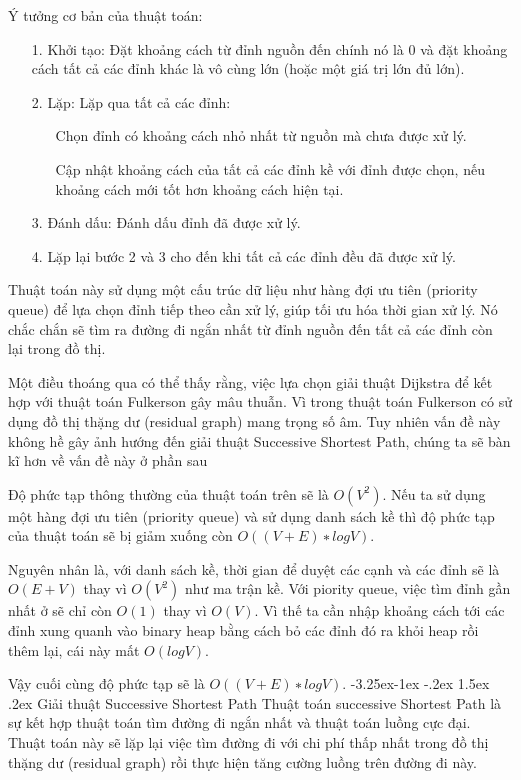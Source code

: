 \documentclass[a4paper]{article}
\makeatletter
\newcounter {subsubsubsection}[subsubsection]
\newcommand\subsubsubsection{\@startsection{subsubsubsection}{4}{\z@}%
                                     {-3.25ex\@plus -1ex \@minus -.2ex}%
                                     {1.5ex \@plus .2ex}%
                                     {\normalfont\normalsize\bfseries}}
\makeatother
\begin{document}
{Ý tưởng cơ bản của thuật toán:}
\begin{enumerate}
    \item[1.] {Khởi tạo: Đặt khoảng cách từ đỉnh nguồn đến chính nó là 0 và đặt khoảng cách tất cả các đỉnh khác là vô cùng lớn (hoặc một giá trị lớn đủ lớn).}
    \item[2.] {Lặp: Lặp qua tất cả các đỉnh:} 
    \begin{enumerate}
        \item[\bullet] {Chọn đỉnh có khoảng cách nhỏ nhất từ nguồn mà chưa được xử lý.}
        \item[\bullet] {Cập nhật khoảng cách của tất cả các đỉnh kề với đỉnh được chọn, nếu khoảng cách mới tốt hơn khoảng cách hiện tại.}
    \end{enumerate}
    \item[3.] {Đánh dấu: Đánh dấu đỉnh đã được xử lý.} 
    \item[4.] {Lặp lại bước 2 và 3 cho đến khi tất cả các đỉnh đều đã được xử lý.} 
\end{enumerate}

{Thuật toán này sử dụng một cấu trúc dữ liệu như hàng đợi ưu tiên (priority queue) để lựa chọn đỉnh tiếp theo cần xử lý, giúp tối ưu hóa thời gian xử lý. Nó chắc chắn sẽ tìm ra đường đi ngắn nhất từ đỉnh nguồn đến tất cả các đỉnh còn lại trong đồ thị.}

{Một điều thoáng qua có thể thấy rằng, việc lựa chọn giải thuật Dijkstra để kết hợp với thuật toán Fulkerson gây mâu thuẫn. Vì trong thuật toán Fulkerson có sử dụng đồ thị thặng dư (residual graph) mang trọng số âm. Tuy nhiên vấn đề này không hề gây ảnh hướng đến giải thuật Successive Shortest Path, chúng ta sẽ bàn kĩ hơn về vấn đề này ở phần sau}

{Độ phức tạp thông thường của thuật toán trên sẽ là $O(V^2)$. Nếu ta sử dụng một hàng đợi ưu tiên (priority queue) và sử dụng danh sách kề thì độ phức tạp của thuật toán sẽ bị giảm xuống còn $O((V+E)∗logV)$.}

{Nguyên nhân là, với danh sách kề, thời gian để duyệt các cạnh và các đỉnh sẽ là $O(E+V)$ thay vì $O(V^2)$ như ma trận kề. Với piority queue, việc tìm đỉnh gần nhất ở sẽ chỉ còn $O(1)$ thay vì $O(V)$. Vì thế ta cần nhập khoảng cách tới các đỉnh xung quanh vào binary heap bằng cách bỏ các đỉnh đó ra khỏi heap rồi thêm lại, cái này mất $O(logV)$.}

{Vậy cuối cùng độ phức tạp sẽ là $O((V+E)∗logV)$.}
\subsubsubsection{Giải thuật Successive Shortest Path}
{Thuật toán successive Shortest Path là sự kết hợp thuật toán tìm đường đi ngắn nhất và thuật toán luồng cực đại. Thuật toán này sẽ lặp lại việc tìm đường đi với chi phí thấp nhất trong đồ thị thặng dư (residual graph) rồi thực hiện tăng cường luồng trên đường đi này. }
\end{document}
